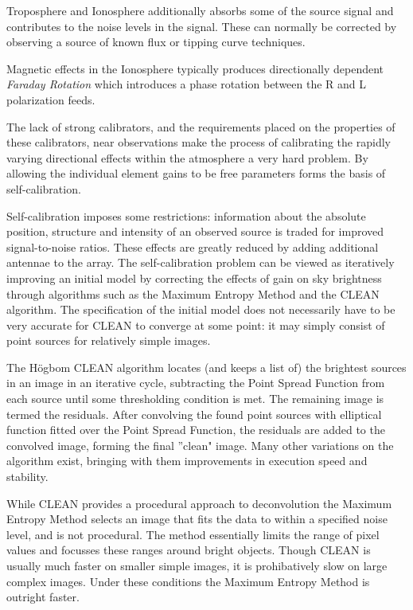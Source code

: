 \documentclass[a4paper,10pt]{report}
\begin{document}
{Troposphere and Ionosphere additionally absorbs some of the source signal and contributes to the noise levels in the signal. These can normally be corrected by observing a source of known flux or tipping curve techniques.

Magnetic effects in the Ionosphere typically produces directionally dependent \textit{Faraday Rotation} which introduces a phase rotation
between the R and L polarization feeds.

The lack of strong calibrators, and the requirements placed on the properties of these calibrators, near observations make the process of calibrating the rapidly varying directional effects within the atmosphere a very hard problem. By allowing the individual element gains to
be free parameters forms the basis of self-calibration. 

Self-calibration imposes some restrictions: information about the absolute position, structure and intensity of an observed source is traded
for improved signal-to-noise ratios. These effects are greatly reduced by adding additional antennae to the array. The self-calibration problem can
be viewed as iteratively improving an initial model by correcting the effects of gain on sky brightness through algorithms such as the Maximum Entropy Method
and the CLEAN algorithm. The specification of the initial model does not necessarily have to be very accurate for CLEAN to converge at some point: it may simply consist of point sources for relatively simple images.

The H\"ogbom CLEAN algorithm locates (and keeps a list of) the brightest sources in an image in an iterative cycle, subtracting the Point Spread Function from each source until some thresholding condition is met. The remaining image is termed the residuals. After convolving the found point sources with elliptical function fitted over the Point Spread Function, the residuals are added to the convolved image, forming the final ''clean" image. Many other variations on the algorithm exist, bringing with them improvements in execution speed and stability.

While CLEAN provides a procedural approach to deconvolution the Maximum Entropy Method selects an image that fits the data to within a specified noise level, and is not procedural.
The method essentially limits the range of pixel values and focusses these ranges around bright objects. Though CLEAN is usually much faster on smaller simple images, it is prohibatively slow on large complex images. Under these conditions the Maximum Entropy Method is outright faster.
}




\end{document}
